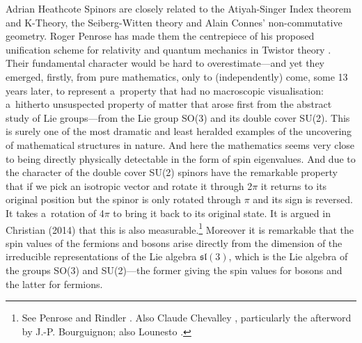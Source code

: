 \begin{artengenv}{Adrian Heathcote}
Spinors are closely related to the Atiyah-Singer Index theorem and K-Theory, the Seiberg-Witten theory and Alain Connes' non-commutative geometry. Roger Penrose has made them the centrepiece of his proposed unification scheme for relativity and quantum mechanics in Twistor theory \parencite{penrose_road_2004_ah}. Their fundamental character would be hard to overestimate---and yet they emerged, firstly, from pure mathematics, only to (independently) come, some 13 years later, to represent a~property that had no macroscopic visualisation: a~hitherto unsuspected property of matter that arose first from the abstract study of Lie groups---from the Lie group SO(3) and its double cover SU(2). This is surely one of the most dramatic and least heralded examples of the uncovering of mathematical structures in nature. And here the mathematics seems very close to being directly physically detectable in the form of spin eigenvalues. And due to the character of the double cover SU(2) spinors have the remarkable property that if we pick an isotropic vector and rotate it through 2$\pi$ it returns to its original position but the spinor is only rotated through $\pi$ and its sign is reversed. It takes a~rotation of 4$\pi$ to bring it back to its original state. It is argued in Christian (2014) that this is also measurable.\footnote{See Penrose and Rindler \parencites*{penrose_spinors_1987}{penrose_spinors_1988}. Also Claude Chevalley \parencite*{chevalley_algebraic_1997}, particularly the afterword by J.-P. Bourguignon; also Lounesto \parencite*{lounesto_clifford_2001}.} Moreover it is remarkable that the spin values of the fermions and bosons arise directly from the dimension of the irreducible representations of the Lie algebra $\mathfrak{sl} (3)$, which is the Lie algebra of the groups SO(3) and SU(2)---the former giving the spin values for bosons and the latter for fermions.


\end{artengenv}
